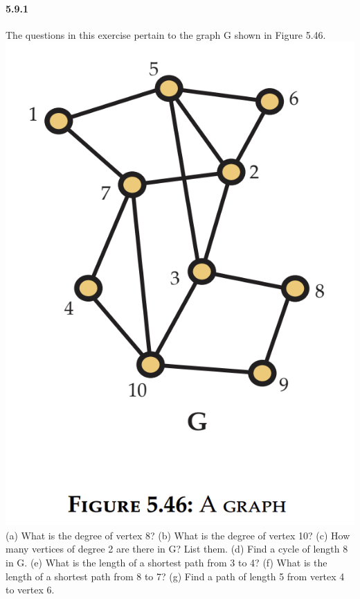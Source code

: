\documentclass{article}
\begin{document}
\paragraph{5.9.1}
The questions in this exercise pertain to the graph G shown in Figure 5.46.\newline
\includegraphics{0036}\newline
(a) What is the degree of vertex 8?\newline
(b) What is the degree of vertex 10?\newline
(c) How many vertices of degree 2 are there in G?
List them.\newline
(d) Find a cycle of length 8 in G.\newline
(e) What is the length of a shortest path from 3 to
4?\newline
(f) What is the length of a shortest path from 8 to
7?\newline
(g) Find a path of length 5 from vertex 4 to vertex 6.\newline
\end{document}
